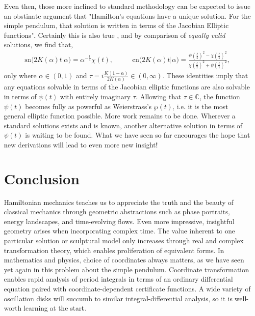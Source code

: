 \documentclass[nofootinbib,preprint]{revtex4-1}
\begin{document}
Even then, those more inclined to standard methodology can be expected to issue an obstinate 
argument that "Hamilton's equations have a unique solution. For the simple pendulum, that 
solution is written in terms of the Jacobian Elliptic functions". Certainly this is also true
\cite{WW1902,WHITTAKER1904}, and by comparison of \textit{equally valid} solutions, we find that,
\begin{eqnarray}
\text{sn}\big(2K(\alpha)t\big|\alpha\big) = \alpha^{-\frac{1}{4}}\chi(t)  , \;\;\;\;\;\;\;\;\;\; 
\text{cn}\big(2K(\alpha)t\big|\alpha\big) = \frac{\psi(\tfrac{t}{2})^2 - \chi(\tfrac{t}{2})^2
}{\chi(\tfrac{t}{2})^2 + \psi(\tfrac{t}{2})^2 },\nonumber
\end{eqnarray}
only where $\alpha \in (0,1)$ and $\tau = i\frac{K(1-\alpha)}{2K(\alpha)} \in (0,\infty)$.
These identities imply that any equations solvable in terms of the Jacobian elliptic functions are also solvable 
in terms of $\psi(t)$ with entirely imaginary $\tau$. Allowing that 
$\tau \in \mathbb{C}$, the function $\psi(t)$ becomes fully as powerful as Weierstrass's 
$\wp(t)$, i.e. it is the most general elliptic function possible. More work remains to 
be done. Wherever a standard solutions exists and is known, another alternative solution 
in terms of $\psi(t)$ is waiting to be found. What we have seen so far encourages the 
hope that new derivations will lead to even more new insight!

\pagebreak 
\section{Conclusion}
Hamiltonian mechanics teaches us to appreciate the truth and the beauty of classical mechanics 
through geometric abstractions such as phase portraits, energy landscapes, and time-evolving flows. 
Even more impressive, insightful geometry arises when incorporating complex time. The value inherent 
to one particular solution or sculptural model only increases through real and complex transformation 
theory, which enables proliferation of equivalent forms. In mathematics and physics, choice of 
coordinates always matters, as we have seen yet again in this problem about the simple pendulum. 
Coordinate transformation enables rapid analysis of period integrals in terms of an ordinary 
differential equation paired with coordinate-dependent certificate functions. A wide variety of 
oscillation disks will succumb to similar integral-differential analysis, so it is well-worth 
learning at the start. 
\end{document}
